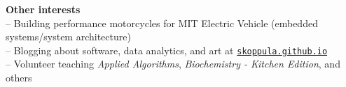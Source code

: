 \documentclass[letterpaper,11pt]{article}
\begin{document}
\vspace{0.1in}
\large \textbf{Other interests\vspace{1mm}} \normalsize \\
\hspace{2mm} -- Building performance motorcycles for MIT Electric Vehicle (embedded systems/system architecture) \\
\hspace{2mm} -- Blogging about software, data analytics, and art at \href{http://www.skoppula.github.io}{\nolinkurl{skoppula.github.io}}\\
\hspace{2mm} -- Volunteer teaching \textit{Applied Algorithms}, \textit{Biochemistry - Kitchen Edition}, and others \\ 
\end{document}
